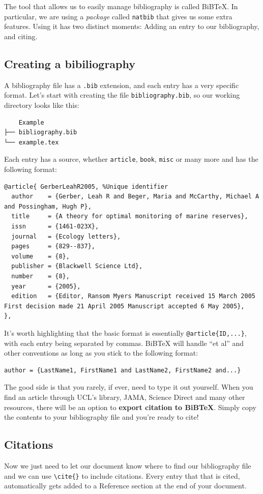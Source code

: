 The tool that allows us to easily manage bibliography is called BiBTeX. In particular, we are using a \emph{package} called \verb|natbib| that gives us some extra features.
Using it has two distinct moments: Adding an entry to our bibliography, and citing.

\clearpage
\subsection{Creating a bibiliography}
A bibliography file has a \verb|.bib| extension, and each entry has a very specific format.
Let's start with creating the file \verb|bibliography.bib|, so our working directory looks like this:
\begin{verbatim}
    Example
├── bibliography.bib
└── example.tex
\end{verbatim}

Each entry has a source, whether \verb|article|, \verb|book|, \verb|misc| or many more and has the following format:
\begin{lstlisting}
@article{ GerberLeahR2005, %Unique identifier
  author    = {Gerber, Leah R and Beger, Maria and McCarthy, Michael A and Possingham, Hugh P},
  title     = {A theory for optimal monitoring of marine reserves},
  issn      = {1461-023X},
  journal   = {Ecology letters},
  pages     = {829--837},
  volume    = {8},
  publisher = {Blackwell Science Ltd},
  number    = {8},
  year      = {2005},
  edition   = {Editor, Ransom Myers Manuscript received 15 March 2005 First decision made 21 April 2005 Manuscript accepted 6 May 2005},
},
\end{lstlisting}

It's worth highlighting that the basic format is essentially \verb|@article{ID,...}|, with each entry being separated by commas.
BiBTeX will handle ``et al'' and other conventions as long as you stick to the following format:
\begin{lstlisting}
author = {LastName1, FirstName1 and LastName2, FirstName2 and...}
\end{lstlisting}

The good side is that you rarely, if ever, need to type it out yourself.
When you find an article through UCL's library, JAMA, Science Direct and many other resources, there will be an option to \textbf{export citation to BiBTeX}.
Simply copy the contents to your bibliography file and you're ready to cite!

\subsection{Citations}
Now we just need to let our document know where to find our bibliography file and we can use \verb|\cite{}| to include citations.
Every entry that that is cited, automatically gets added to a Reference section at the end of your document.


